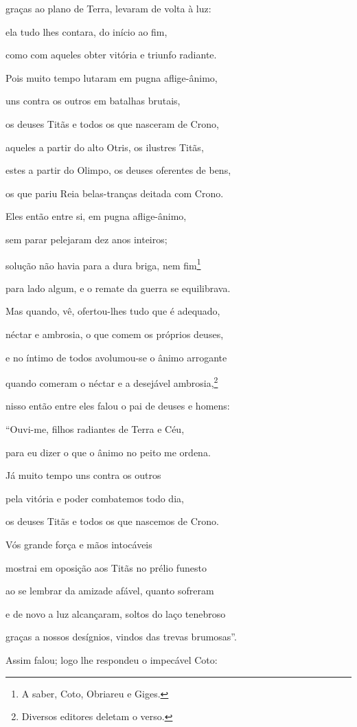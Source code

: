 \begin{pages}
\begin{Rightside}
graças ao plano de Terra, levaram de volta à luz:

ela tudo lhes contara, do início ao fim,

como com aqueles obter vitória e triunfo radiante.

Pois muito tempo lutaram em pugna aflige-ânimo,

uns contra os outros em batalhas brutais, 

os deuses Titãs e todos os que nasceram de Crono, 

aqueles a partir do alto Otris, os ilustres Titãs, 

estes a partir do Olimpo, os deuses oferentes de bens,

os que pariu Reia belas-tranças deitada com Crono.

Eles então entre si, em pugna aflige-ânimo, 

sem parar pelejaram dez anos inteiros;

solução não havia para a dura briga, nem fim\footnote{A saber, Coto, Obriareu e Giges.}

para lado algum, e o remate da guerra se equilibrava.

\quad{}Mas quando, vê, ofertou-lhes tudo que é adequado,

néctar e ambrosia, o que comem os próprios deuses, 

e no íntimo de todos avolumou-se o ânimo arrogante

quando comeram o néctar e a desejável ambrosia,\footnote{Diversos editores deletam o verso.}

nisso então entre eles falou o pai de deuses e homens:

``Ouvi-me, filhos radiantes de Terra e Céu,

para eu dizer o que o ânimo no peito me ordena. 

Já muito tempo uns contra os outros

pela vitória e poder combatemos todo dia,

os deuses Titãs e todos os que nascemos de Crono.

Vós grande força e mãos intocáveis

mostrai em oposição aos Titãs no prélio funesto 

ao se lembrar da amizade afável, quanto sofreram

e de novo a luz alcançaram, soltos do laço tenebroso

graças a nossos desígnios, vindos das trevas brumosas''.

\quad{}Assim falou; logo lhe respondeu o impecável Coto:


\end{Rightside}
\end{pages}
